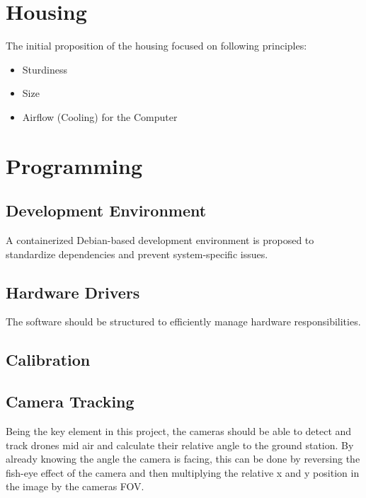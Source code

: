 \section{Housing}

The initial proposition of the housing focused on following principles:
\begin{itemize}
	\item Sturdiness
	\item Size
	\item Airflow (Cooling) for the Computer
\end{itemize}


\section{Programming}

\subsection{Development Environment}

A containerized Debian-based development environment is proposed to standardize dependencies and prevent system-specific issues.

\subsection{Hardware Drivers}

The software should be structured to efficiently manage hardware responsibilities.

\subsection{Calibration}

\subsection{Camera Tracking}
Being the key element in this project, the cameras should be able to detect and track drones mid air and calculate their relative angle to the ground station. By already knowing the angle the camera is facing, this can be done by reversing the fish-eye effect of the camera and then multiplying the relative x and y position in the image by the cameras FOV.


